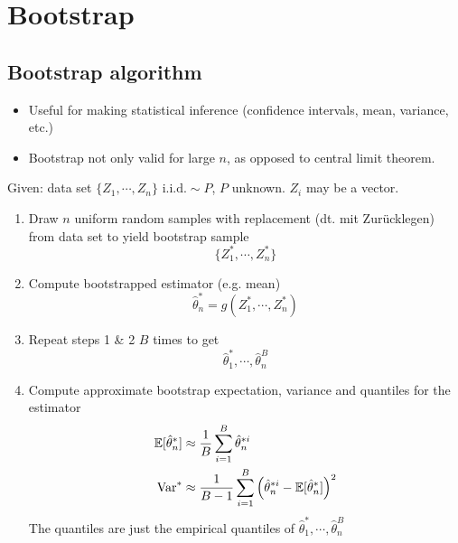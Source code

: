 \section{Bootstrap}
\subsection{Bootstrap algorithm}
\begin{application}
\begin{itemize}
 \item Useful for making statistical inference (confidence intervals, mean, variance, etc.)
 \item[\leftthumbsup] Bootstrap not only valid for large $n$, as opposed to central limit theorem.
\end{itemize}
\end{application}
\begin{theory}
 Given: data set $\{Z_1, \cdots, Z_n\} \text{ i.i.d.} \sim P$, $P$ unknown. $Z_i$ may be a vector.
 \begin{enumerate}
  \item Draw $n$ uniform random samples with replacement (dt. mit Zur{\"u}cklegen) from data set to yield bootstrap sample
        \begin{equation*}
         \{Z_1^*, \cdots, Z_n^*\}
        \end{equation*} 
  \item Compute bootstrapped estimator (e.g. mean)
        \begin{equation*}
         \hat{\theta}_n^{\ast} = g(Z_1^*, \cdots, Z_n^{\ast})
        \end{equation*}
  \item Repeat steps 1 \& 2 $B$ times to get
        \begin{equation*}
         \hat{\theta}_1^{\ast}, \cdots, \hat{\theta}_n^B
        \end{equation*}
  \item Compute approximate bootstrap expectation, variance and quantiles for the estimator
        \begin{align*}
        \mathbb{E}[\hat{\theta}^{\ast}_n] & \approx \frac{1}{B} \sum_{i=1}^B \hat{\theta}_n^{\ast i}\\
        \operatorname{Var}^{\ast}                       & \approx \frac{1}{B-1} \sum_{i=1}^B \left( \hat{\theta}_n^{\ast i} - \mathbb{E}[\hat{\theta}^{\ast}_n] \right)^2
        \end{align*}  
        The quantiles are just the empirical quantiles of $\hat{\theta}_1^{\ast}, \cdots, \hat{\theta}_n^B$
 \end{enumerate}
\end{theory}
